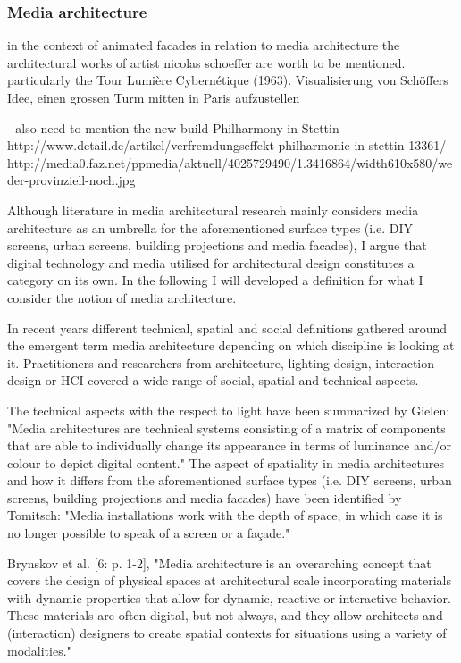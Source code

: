 

\subsubsection{Media architecture}

in the context of animated facades in relation to media architecture the architectural works of artist nicolas schoeffer are worth to be mentioned. particularly the  Tour Lumière Cybernétique (1963). Visualisierung von Schöffers Idee, einen grossen Turm mitten in Paris aufzustellen

- also need to mention the new build Philharmony in Stettin 
http://www.detail.de/artikel/verfremdungseffekt-philharmonie-in-stettin-13361/
-http://media0.faz.net/ppmedia/aktuell/4025729490/1.3416864/width610x580/weder-provinziell-noch.jpg

Although literature in media architectural research mainly considers media architecture as an umbrella for the aforementioned surface types (i.e. DIY screens, urban screens, building projections and media facades), I argue that digital technology and media utilised for architectural design constitutes a category on its own. In the following I will developed a definition for what I consider the notion of media architecture.

In recent years different technical, spatial and social definitions gathered around the emergent term media architecture depending on which discipline is looking at it. Practitioners and researchers from architecture, lighting design, interaction design or HCI covered a wide range of social, spatial and technical aspects. 


The technical aspects with the respect to light have been summarized by Gielen: "Media architectures are technical systems consisting of a matrix of components that are able to individually change its appearance in terms of luminance and/or colour to depict digital content." 
The aspect of spatiality in media architectures and how it differs from the aforementioned surface types (i.e. DIY screens, urban screens, building projections and media facades) have been identified by Tomitsch: "Media installations work with the depth of space, in which case it is no longer possible to speak of a screen or a façade." 

Brynskov et al. [6: p. 1-2], "Media architecture is an overarching concept that covers the design of physical spaces at architectural scale incorporating materials with dynamic properties that allow for dynamic, reactive or interactive behavior. These materials are often digital, but not always, and they allow architects and (interaction) designers to create spatial contexts for situations using a variety of modalities."


